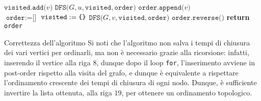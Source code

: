 \documentclass[a4paper, 12pt]{report}
\begin{document}
    \begin{algorithm}[H]
        \caption{
            Dato un grafo diretto aciclico connesso $G$, rappresentato attraverso liste di adiacenza in cui vengono salvati gli archi adiacenti uscenti, l'algoritmo restituisce un ordinamento topologico di $G$.\\
            \textbf{Input}: $G$ grafo diretto, rappresentato attraverso liste di adiacenza.\\
            \textbf{Output}: un ordinamento topologico di $G$.
        }

        \begin{algorithmic}[1]
                \State $\texttt{visited.add(}v\texttt{)}$
                 
                        \State $\texttt{DFS(}G, u, \texttt{visited},\texttt{order)}$
                    \EndIf
                \EndFor
                \State $\texttt{order.append(}v\texttt{)}$ 
            \EndFunction
            \\
                \State $\texttt{order} := \texttt{[]}$
                \State $\texttt{visited} := \verb|{|\verb|}|$
                        \State $\texttt{DFS(}G, v, \texttt{visited},\texttt{order)}$
                    \EndIf
                \EndFor
                \State $\texttt{order.reverse()}$ 
                \State \textbf{return} \texttt{order}
            \EndFunction
        \end{algorithmic}
    \end{algorithm}

    \begin{framedobs}{Correttezza dell'algoritmo}
        Si noti che l'algoritmo non salva i tempi di chiusura dei vari vertici per ordinarli, ma non è necessario grazie alla ricorsione: infatti, inserendo il vertice alla riga $8$, dunque dopo il loop \texttt{for}, l'inserimento avviene in post-order rispetto alla visita del grafo, e dunque è equivalente a rispettare l'ordinamento crescente dei tempi di chiusura di ogni nodo. Dunque, è sufficiente invertire la lista ottenuta, alla riga $19$, per ottenere un ordinamento topologico.
    \end{framedobs}
\end{document}
